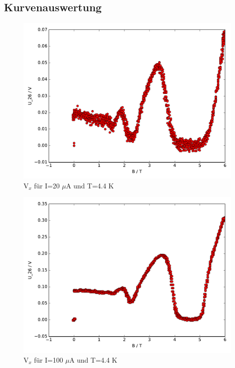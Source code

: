 \FloatBarrier
\subsection{Kurvenauswertung}



\begin{figure}
\label{}
\centering
\includegraphics[scale = 0.5]{../plots/U_26_20muA_4400mK.pdf}
\caption{$\text{V}_x$ für I=20 $\mu$A und T=4.4 K}
\end{figure}

\begin{figure}
\label{}
\centering
\includegraphics[scale = 0.5]{../plots/U_26_100muA_4400mK.pdf}
\caption{$\text{V}_x$ für I=100 $\mu$A und T=4.4 K}
\end{figure}

